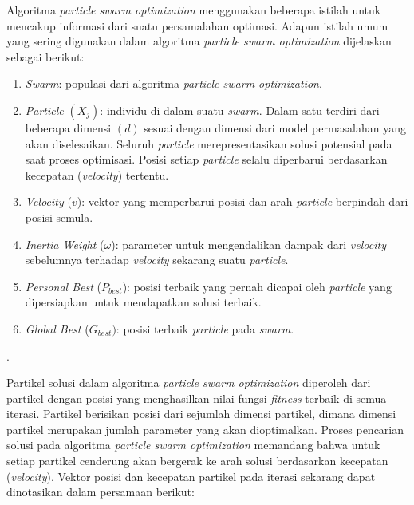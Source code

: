 {{    Algoritma \textit{particle swarm optimization} menggunakan beberapa istilah untuk mencakup informasi dari suatu persamalahan optimasi.
    Adapun istilah umum yang sering digunakan dalam algoritma \textit{particle swarm optimization} dijelaskan sebagai berikut:
    \begin{enumerate}[align=left, left=0em, nolistsep]
        \item \textit{Swarm}: populasi dari algoritma \textit{particle swarm optimization}.
        \item \textit{Particle} $(X_{j})$: individu di dalam suatu \textit{swarm}.
              Dalam satu terdiri dari beberapa dimensi $(d)$ sesuai dengan dimensi dari model permasalahan yang akan diselesaikan.
              Seluruh \textit{particle} merepresentasikan solusi potensial pada saat proses optimisasi.
              Posisi setiap \textit{particle} selalu diperbarui berdasarkan kecepatan (\textit{velocity}) tertentu.
        \item \textit{Velocity} (\textbf{$v$}): vektor yang memperbarui posisi dan arah \textit{particle} berpindah dari posisi semula.
        \item \textit{Inertia Weight} ($\omega$): parameter untuk mengendalikan dampak dari \textit{velocity} sebelumnya terhadap \textit{velocity} sekarang suatu \textit{particle}.
        \item \textit{Personal Best} ($P_{best}$): posisi terbaik yang pernah dicapai oleh \textit{particle} yang dipersiapkan untuk mendapatkan solusi terbaik.
        \item \textit{Global Best} ($G_{best})$: posisi terbaik \textit{particle} pada \textit{swarm}.
    \end{enumerate}
    \begin{rightcite}
        .
    \end{rightcite}

    Partikel solusi dalam algoritma \textit{particle swarm optimization} diperoleh dari partikel dengan posisi yang menghasilkan nilai fungsi \textit{fitness} terbaik di semua iterasi.
    Partikel berisikan posisi dari sejumlah dimensi partikel, dimana dimensi partikel merupakan jumlah parameter yang akan dioptimalkan.
    Proses pencarian solusi pada algoritma \textit{particle swarm optimization} memandang bahwa untuk setiap partikel cenderung akan bergerak ke arah solusi berdasarkan kecepatan (\textit{velocity}).
    Vektor posisi dan kecepatan partikel pada iterasi sekarang dapat dinotasikan dalam persamaan berikut:

}}
